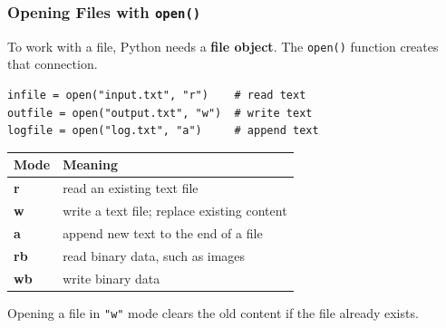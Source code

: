 \documentclass[aspectratio=169,10pt]{beamer}
\newcommand{\keyword}[1]{\textcolor{PrimaryBlue}{\textbf{#1}}}
\newcommand{\codeword}[1]{\texttt{#1}}
\begin{document}
\begin{frame}[fragile]
\frametitle{Opening Files with \texttt{open()}}
\small
To work with a file, Python needs a \keyword{file object}. The \codeword{open()} function creates that connection.

\vspace{0.15cm}
\begin{lstlisting}[style=pycode]
infile = open("input.txt", "r")    # read text
outfile = open("output.txt", "w")  # write text
logfile = open("log.txt", "a")     # append text
\end{lstlisting}

\begin{center}
\begin{tabularx}{0.92\textwidth}{>{\bfseries\ttfamily}p{1.6cm}X}
\toprule
Mode & Meaning \\
\midrule
r  & read an existing text file \\
w  & write a text file; replace existing content \\
a  & append new text to the end of a file \\
rb & read binary data, such as images \\
wb & write binary data \\
\bottomrule
\end{tabularx}
\end{center}

\begin{tcolorbox}[lecturebox,title=Important warning]
Opening a file in \codeword{"w"} mode clears the old content if the file already exists.
\end{tcolorbox}
\end{frame}
\end{document}
